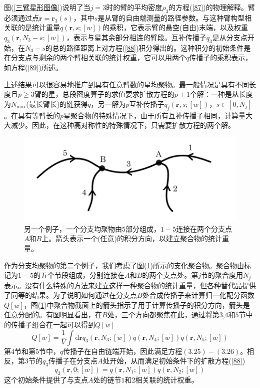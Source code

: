 图(\ref{三臂星形图像})说明了当$j=3$时的臂的平均密度$\rho _3$的方程(\ref{87})的物理解释。臂必须通过点$\mathbf{r}=\mathbf{r}_3(s)$，其中$s$是从臂的自由端测量的路径参数。与这种臂构型相关联的是统计重量$q(\mathbf{r},s;[w])$的乘积，它表示臂的悬空(自由)末端，以及权重$q_{3}(\mathbf{r},N_{3}-s;[w])$，表示与星其余部分相连的臂段。互补传播子$q_3$是从分支点开始，在$N_3-s$的总的路径距离上对方程(\ref{88})积分得出的。这种积分的初始条件是在分支点与剩余的两个臂相关联的统计权重，它可以用两个$q$传播子的乘积表示，如方程(\ref{89})所述。

上述结果可以很容易地推广到具有任意臂数的星均聚物。最一般情况是具有不同长度且$p\geq3$臂的星，总段密度算子的求值要求扩散方程的$p+1$个解：一种是从长度为$N_{\max}$(最长臂长)的链获得$q$，另一解为$p$互补传播子$q_j(\mathbf{r},s;[w])$，$s\in [0,N_j]$。在具有等臂长的$p$星聚合物的特殊情况下，由于所有互补传播子相同，计算量大大减少。因此，在这种高对称性的特殊情况下，只需要扩散方程的两个解。

\begin{figure}[H]
\centering
\includegraphics[scale=0.7]{./figures/36.png}
\caption{另一个例子，一个分支均聚物由$5$部分组成，$1-5$连接在两个分支点$A$和$B$上。箭头表示一个(任意)的积分方向，以建立聚合物的统计重量。}
\label{AB嵌段}
\end{figure}

作为分支均聚物的第二个例子，我们考虑了图(\ref{AB嵌段})所示的支化聚合物。聚合物由标记为$1-5$的五个节段组成，分别连接在$A$和$B$的两个支点处。第$j$节的聚合度用$N_j$表示。没有什么特殊的方法来建立这样一种聚合物的统计重量，但各种替代品提供了同等的结果。为了说明如何通过在分支点$B$处合成传播子来计算归一化配分函数$Q[w]$，图(\ref{AB嵌段})中聚合物截面上的箭头指示了用于计算传播子的积分方向，箭头是任意分配的。有图明显看出，在$B$处，三个方向都聚焦在此，通过将第$3$,$4$和$5$节中的传播子组合在一起可以得到$Q[w]$
\begin{equation}
Q[w]=\frac{1}{V}\int \mathrm{d}\mathbf{r}q_3(\mathbf{r},N_3;[w])q(\mathbf{r},N_4;[w])q(\mathbf{r},N_5;[w])
\end{equation}
第$4$节和第$5$节中，$q$传播子在自由链端开始，因此满足方程$(3.25)-(3.26)$。相反，第3节的$q_3$传播子在分支点$A$处开始，从而满足初始条件下的扩散方程(\ref{88})
\begin{equation}
q_3(\mathbf{r},0;[w])=q(\mathbf{r},N_1;[w])q(\mathbf{r},N_2;[w])
\end{equation}
这个初始条件提供了与支点$A$处的链节$1$和$2$相关联的统计权重。

